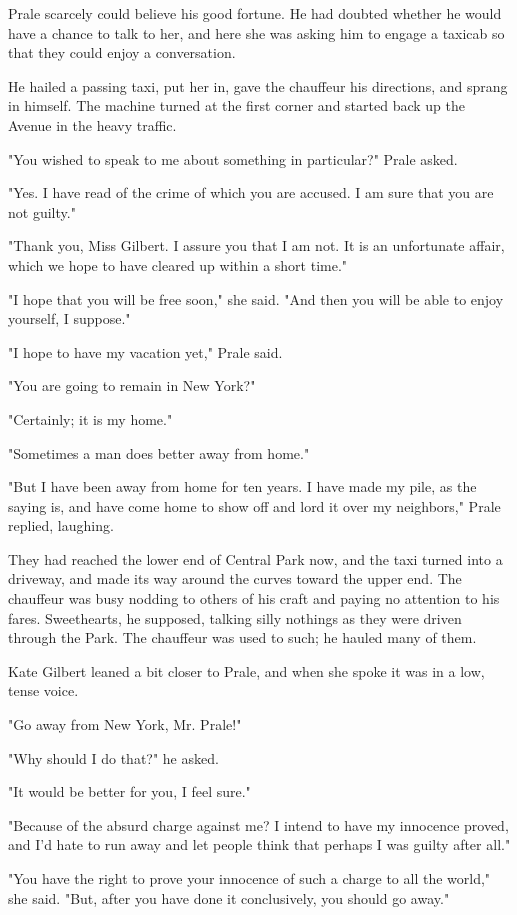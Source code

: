 \documentclass{novel}
\begin{document}
Prale scarcely could believe his good fortune. He had doubted whether he would have a chance to talk to her, and here she was asking him to engage a taxicab so that they could enjoy a conversation.

He hailed a passing taxi, put her in, gave the chauffeur his directions, and sprang in himself. The machine turned at the first corner and started back up the Avenue in the heavy traffic.

"You wished to speak to me about something in particular?" Prale asked.

"Yes. I have read of the crime of which you are accused. I am sure that you are not guilty."

"Thank you, Miss Gilbert. I assure you that I am not. It is an unfortunate affair, which we hope to have cleared up within a short time."

"I hope that you will be free soon," she said. "And then you will be able to enjoy yourself, I suppose."

"I hope to have my vacation yet," Prale said.

"You are going to remain in New York?"

"Certainly; it is my home."

"Sometimes a man does better away from home."

"But I have been away from home for ten years. I have made my pile, as the saying is, and have come home to show off and lord it over my neighbors," Prale replied, laughing.

They had reached the lower end of Central Park now, and the taxi turned into a driveway, and made its way around the curves toward the upper end. The chauffeur was busy nodding to others of his craft and paying no attention to his fares. Sweethearts, he supposed, talking silly nothings as they were driven through the Park. The chauffeur was used to such; he hauled many of them.

Kate Gilbert leaned a bit closer to Prale, and when she spoke it was in a low, tense voice.

"Go away from New York, Mr. Prale!"

"Why should I do that?" he asked.

"It would be better for you, I feel sure."

"Because of the absurd charge against me? I intend to have my innocence proved, and I'd hate to run away and let people think that perhaps I was guilty after all."

"You have the right to prove your innocence of such a charge to all the world," she said. "But, after you have done it conclusively, you should go away."
\end{document}
